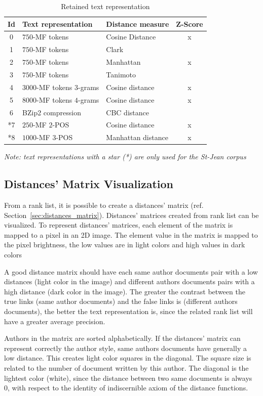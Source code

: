 \begin{table}
  \centering
  \caption{Retained text representation}
  \label{tab:9rl}
  \begin{tabular}{c l l c}
    \toprule
    Id &
    Text representation &
    Distance measure &
    Z-Score \\
    \midrule
    0 & $750$-MF tokens & Cosine Distance & x\\
    1 & $750$-MF tokens & Clark & \\
    2 & $750$-MF tokens & Manhattan & x\\
    3 & $750$-MF tokens & Tanimoto & \\
    4 & $3000$-MF tokens $3$-grams & Cosine distance & x\\
    5 & $8000$-MF tokens $4$-grams & Cosine distance & x\\
    6 & BZip2 compression & CBC distance & \\
    *7 & $250$-MF $2$-POS & Cosine distance & x\\
    *8 & $1000$-MF $3$-POS & Manhattan distance & x\\
    \bottomrule
  \end{tabular}

  \textit{Note: text representations with a star (*) are only used for the St-Jean corpus}
\end{table}

\subsection{Distances' Matrix Visualization}

From a rank list, it is possible to create a distances' matrix (ref. Section~\ref{sec:distances_matrix}).
Distances' matrices created from rank list can be visualized.
To represent distances' matrices, each element of the matrix is mapped to a pixel in an 2D image.
The element value in the matrix is mapped to the pixel brightness, the low values are in light colors and high values in dark colors

A good distance matrix should have each same author documents pair with a low distances (light color in the image) and different authors documents pairs with a high distance (dark color in the image).
The greater the contrast between the true links (same author documents) and the false links is (different authors documents), the better the text representation is, since the related rank list will have a greater average precision.

Authors in the matrix are sorted alphabetically.
If the distances' matrix can represent correctly the author style, same authors documents have generally a low distance.
This creates light color squares in the diagonal.
The square size is related to the number of document written by this author.
The diagonal is the lightest color (white), since the distance between two same documents is always 0, with respect to the identity of indiscernible axiom of the distance functions.

